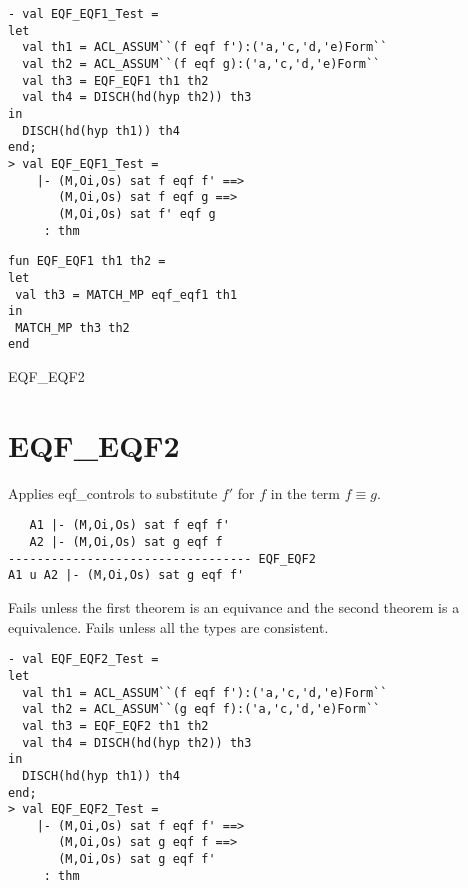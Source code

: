 \EXAMPLE
\begin{holboxed}
\begin{verbatim}
- val EQF_EQF1_Test =
let
  val th1 = ACL_ASSUM``(f eqf f'):('a,'c,'d,'e)Form``
  val th2 = ACL_ASSUM``(f eqf g):('a,'c,'d,'e)Form``
  val th3 = EQF_EQF1 th1 th2
  val th4 = DISCH(hd(hyp th2)) th3
in
  DISCH(hd(hyp th1)) th4
end;
> val EQF_EQF1_Test =
    |- (M,Oi,Os) sat f eqf f' ==>
       (M,Oi,Os) sat f eqf g ==>
       (M,Oi,Os) sat f' eqf g
     : thm
\end{verbatim}
\end{holboxed}

\IMPLEMENTATION
\begin{holboxed}
\begin{verbatim}
fun EQF_EQF1 th1 th2 =
let
 val th3 = MATCH_MP eqf_eqf1 th1
in
 MATCH_MP th3 th2
end
\end{verbatim}
\end{holboxed}

\SEEALSO
EQF\_EQF2

\ENDDOC

\section{EQF\_EQF2}



\egroup

\SYNOPSIS 
Applies eqf_controls to substitute $f'$ for $f$ in the term $f \equiv g$.

\DESCRIBE
\begin{verbatim}
   A1 |- (M,Oi,Os) sat f eqf f'
   A2 |- (M,Oi,Os) sat g eqf f
---------------------------------- EQF_EQF2
A1 u A2 |- (M,Oi,Os) sat g eqf f'
\end{verbatim}
\FAILURE
Fails unless the first theorem is an equivance and the second theorem is
a equivalence.  Fails unless all the types are consistent.

\EXAMPLE
\begin{holboxed}
\begin{verbatim}
- val EQF_EQF2_Test =
let
  val th1 = ACL_ASSUM``(f eqf f'):('a,'c,'d,'e)Form``
  val th2 = ACL_ASSUM``(g eqf f):('a,'c,'d,'e)Form``
  val th3 = EQF_EQF2 th1 th2
  val th4 = DISCH(hd(hyp th2)) th3
in
  DISCH(hd(hyp th1)) th4
end;
> val EQF_EQF2_Test =
    |- (M,Oi,Os) sat f eqf f' ==>
       (M,Oi,Os) sat g eqf f ==>
       (M,Oi,Os) sat g eqf f'
     : thm
\end{verbatim}
\end{holboxed}

